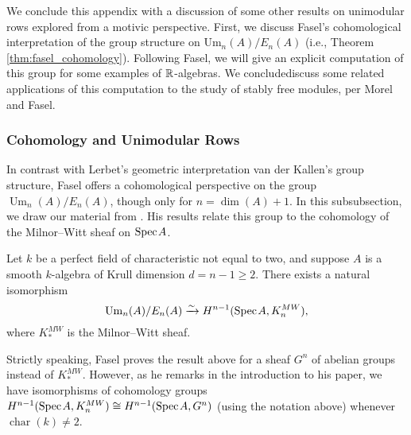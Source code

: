 We conclude this appendix with a discussion of some other results on unimodular rows explored from a motivic perspective. First, we discuss Fasel's cohomological interpretation of the group structure on $\mathrm{Um}_n(A)/E_n(A)$ (i.e., Theorem \ref{thm:fasel_cohomology}). Following Fasel, we will give an explicit computation of this group for some examples of $\mathbb{R}$-algebras. We concludediscuss some related applications of this computation to the study of stably free modules, per Morel and Fasel. 

\subsubsection{Cohomology and Unimodular Rows} In contrast with Lerbet's geometric interpretation van der Kallen's group structure, Fasel offers a cohomological perspective on the group $\operatorname{Um}_n(A)/E_n(A)$, though only for $n = \dim(A) + 1$. In this subsubsection, we draw our material from \cite[Sections 3, 4]{Fasel_2010}. His results relate this group to the cohomology of the Milnor--Witt sheaf on $\text{Spec}\hspace{0.1em} A$.

\begin{theorem}\cite[Theorem 4.9]{Fasel_2010}
    Let $k$ be a perfect field of characteristic not equal to two, and suppose $A$ is a smooth $k$-algebra of Krull dimension $d = n-1 \geq 2$. There exists a natural isomorphism 
    \[
    \mathrm{Um}_n(A)/E_n(A) \xrightarrow{\sim} H^{n-1}(\text{Spec}\hspace{0.1em} A,K_{n}^{MW}),
    \]
    where $K_*^{MW}$ is the Milnor--Witt sheaf.
\end{theorem}

\begin{remark}
    Strictly speaking, Fasel proves the result above for a sheaf $G^{n}$ of abelian groups instead of $K_*^{MW}$. However, as he remarks in the introduction to his paper, we have isomorphisms of cohomology groups $H^{n-1}(\text{Spec}\hspace{0.1em} A, K_n^{MW}) \cong H^{n-1}(\text{Spec}\hspace{0.1em} A, G^n)$ (using the notation above) whenever $\operatorname{char}(k) \neq 2$.
\end{remark}

